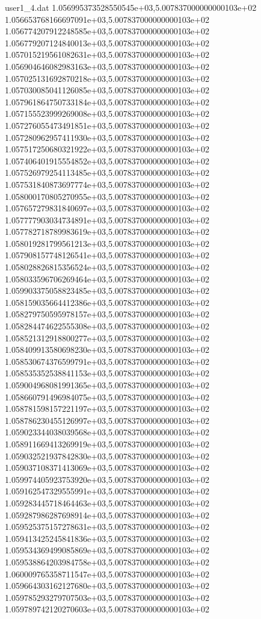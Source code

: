 \begin{filecontents}{user1_4.dat}
1.056995373528550545e+03,5.007837000000000103e+02
1.056653768166697091e+03,5.007837000000000103e+02
1.056774207912248585e+03,5.007837000000000103e+02
1.056779207124840013e+03,5.007837000000000103e+02
1.057015219561082631e+03,5.007837000000000103e+02
1.056904646082983163e+03,5.007837000000000103e+02
1.057025131692870218e+03,5.007837000000000103e+02
1.057030085041126085e+03,5.007837000000000103e+02
1.057961864750733184e+03,5.007837000000000103e+02
1.057155523999269008e+03,5.007837000000000103e+02
1.057276055473491851e+03,5.007837000000000103e+02
1.057280962957411930e+03,5.007837000000000103e+02
1.057517250680321922e+03,5.007837000000000103e+02
1.057406401915554852e+03,5.007837000000000103e+02
1.057526979254113485e+03,5.007837000000000103e+02
1.057531840873697774e+03,5.007837000000000103e+02
1.058000170805270955e+03,5.007837000000000103e+02
1.057657279831840697e+03,5.007837000000000103e+02
1.057777903034734891e+03,5.007837000000000103e+02
1.057782718789983619e+03,5.007837000000000103e+02
1.058019281799561213e+03,5.007837000000000103e+02
1.057908157748126541e+03,5.007837000000000103e+02
1.058028826815356524e+03,5.007837000000000103e+02
1.058033596706269464e+03,5.007837000000000103e+02
1.059903375058823485e+03,5.007837000000000103e+02
1.058159035664412386e+03,5.007837000000000103e+02
1.058279750595978157e+03,5.007837000000000103e+02
1.058284474622555308e+03,5.007837000000000103e+02
1.058521312918800277e+03,5.007837000000000103e+02
1.058409913580698230e+03,5.007837000000000103e+02
1.058530674376599791e+03,5.007837000000000103e+02
1.058535352538841153e+03,5.007837000000000103e+02
1.059004968081991365e+03,5.007837000000000103e+02
1.058660791496984075e+03,5.007837000000000103e+02
1.058781598157221197e+03,5.007837000000000103e+02
1.058786230455126997e+03,5.007837000000000103e+02
1.059023344038039568e+03,5.007837000000000103e+02
1.058911669413269919e+03,5.007837000000000103e+02
1.059032521937842830e+03,5.007837000000000103e+02
1.059037108371413069e+03,5.007837000000000103e+02
1.059974405923753920e+03,5.007837000000000103e+02
1.059162547329555991e+03,5.007837000000000103e+02
1.059283445718464463e+03,5.007837000000000103e+02
1.059287986287698914e+03,5.007837000000000103e+02
1.059525375157278631e+03,5.007837000000000103e+02
1.059413425245841836e+03,5.007837000000000103e+02
1.059534369499085869e+03,5.007837000000000103e+02
1.059538864203984758e+03,5.007837000000000103e+02
1.060009765358711547e+03,5.007837000000000103e+02
1.059664303162127680e+03,5.007837000000000103e+02
1.059785293279707503e+03,5.007837000000000103e+02
1.059789742120270603e+03,5.007837000000000103e+02

\end{filecontents}
